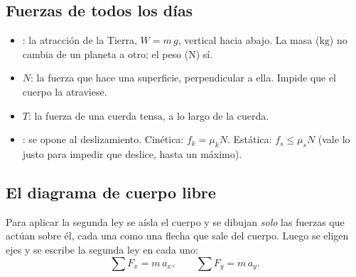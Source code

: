 \documentclass[11pt,a4paper]{article}
\begin{document}
\subsection{Fuerzas de todos los días}
\begin{itemize}
\item {}: la atracción de la Tierra, $W=m\,g$, vertical hacia abajo. La masa ($\si{\kilo\gram}$) no cambia de un
      planeta a otro; el peso ($\si{\newton}$) sí.
\item {} $N$: la fuerza que hace una superficie, perpendicular a ella. Impide que el cuerpo la atraviese.
\item {} $T$: la fuerza de una cuerda tensa, a lo largo de la cuerda.
\item {}: se opone al deslizamiento. Cinética: $f_k=\mu_k N$. Estática: $f_s\le\mu_s N$ (vale lo justo para
      impedir que deslice, hasta un máximo).
\end{itemize}

\subsection{El diagrama de cuerpo libre}
\begin{minipage}[c]{0.5\linewidth}
Para aplicar la segunda ley se aísla el cuerpo y se dibujan \emph{solo} las fuerzas que actúan sobre él, cada una
como una flecha que sale del cuerpo. Luego se eligen ejes y se escribe la segunda ley en cada uno:
\[ \textstyle\sum F_x=m\,a_x,\qquad \sum F_y=m\,a_y. \]
\end{minipage}\hfill
\begin{minipage}[c]{0.46\linewidth}\centering
{}
\end{minipage}
\end{document}
